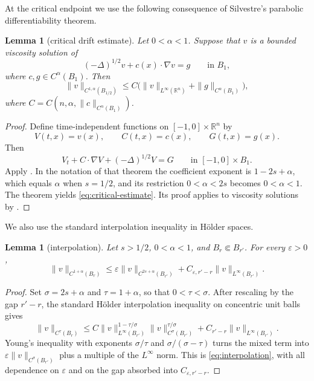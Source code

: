 \documentclass[reqno]{amsart}
\numberwithin{equation}{section}
\theoremstyle{plain}
\newtheorem{lemma}[theorem]{Lemma}
\theoremstyle{definition}
\theoremstyle{remark}
\newcommand{\R}{\mathbb R}
\begin{document}
At the critical endpoint we use the following consequence of Silvestre's
parabolic differentiability theorem.

\begin{lemma}[critical drift estimate]\label{lem:critical}
Let $0<\alpha<1$.  Suppose that $v$ is a bounded viscosity solution of
\begin{equation}\label{eq:critical-equation}
 (-\Delta)^{1/2}v+c(x)\cdot\nabla v=g
 \qquad\text{in }B_1,
\end{equation}
where $c,g\in C^\alpha(B_1)$.  Then
\begin{equation}\label{eq:critical-estimate}
 \|v\|_{C^{1,\alpha}(B_{1/2})}
 \le C\bigl(\|v\|_{L^\infty(\R^n)}
             +\|g\|_{C^\alpha(B_1)}\bigr),
\end{equation}
where $C=C(n,\alpha,\|c\|_{C^\alpha(B_1)})$.
\end{lemma}

\begin{proof}
Define time-independent functions on $[-1,0]\times\R^n$ by
\[
 V(t,x)=v(x),\qquad C(t,x)=c(x),\qquad G(t,x)=g(x).
\]
Then
\[
 V_t+C\cdot\nabla V+(-\Delta)^{1/2}V=G
 \qquad\text{in }[-1,0]\times B_1.
\]
Apply \cite[Theorem~1.1]{Silvestre2012Diff}.  In the notation of that
theorem the coefficient exponent is $1-2s+\alpha$, which equals $\alpha$
when $s=1/2$, and its restriction $0<\alpha<2s$ becomes $0<\alpha<1$.
The theorem yields \eqref{eq:critical-estimate}.  Its proof applies to
viscosity solutions by \cite[Section~3]{Silvestre2012Diff}.
\end{proof}

We also use the standard interpolation inequality in H\"older spaces.

\begin{lemma}[interpolation]\label{lem:interpolation}
Let $s>1/2$, $0<\alpha<1$, and
$B_r\Subset B_{r'}$.  For every $\varepsilon>0$,
\begin{equation}\label{eq:interpolation}
 \|v\|_{C^{1+\alpha}(B_r)}
 \le \varepsilon\|v\|_{C^{2s+\alpha}(B_{r'})}
 +C_{\varepsilon,r'-r}\|v\|_{L^\infty(B_{r'})}.
\end{equation}
\end{lemma}

\begin{proof}
\begingroup
Set $\sigma=2s+\alpha$ and $\tau=1+\alpha$, so that
$0<\tau<\sigma$.  After rescaling by the gap $r'-r$, the standard H\"older
interpolation inequality on concentric unit balls gives
\[
 \|v\|_{C^\tau(B_r)}
 \le C\|v\|_{L^\infty(B_{r'})}^{1-\tau/\sigma}
       \|v\|_{C^\sigma(B_{r'})}^{\tau/\sigma}
 +C_{r'-r}\|v\|_{L^\infty(B_{r'})}.
\]
Young's inequality with exponents $\sigma/\tau$ and
$\sigma/(\sigma-\tau)$ turns the mixed term into
$\varepsilon\|v\|_{C^\sigma(B_{r'})}$ plus a multiple of the
$L^\infty$ norm.  This is \eqref{eq:interpolation}, with all dependence on
$\varepsilon$ and on the gap absorbed into $C_{\varepsilon,r'-r}$.
\endgroup
\end{proof}
\end{document}

